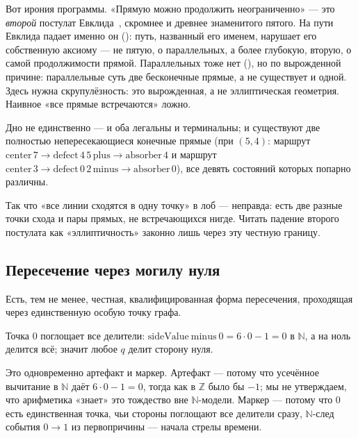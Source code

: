 Вот ирония программы. «Прямую можно продолжить неограниченно» --- это \emph{второй} постулат
Евклида~\cite{euclid-elements}, скромнее и древнее знаменитого пятого. На пути Евклида падает именно он
(): путь, названный его именем, нарушает его собственную аксиому ---
не пятую, о параллельных, а более глубокую, вторую, о самой продолжимости прямой. Параллельных тоже нет
(), но по вырожденной причине: параллельные суть две бесконечные прямые, а не
существует и одной. Здесь нужна скрупулёзность: это вырожденная, а не эллиптическая геометрия. Наивное
«все прямые встречаются» ложно.

\begin{theorem}\label{thm:two_disjoint_lines}
\green{} Дно не единственно ---  и  оба легальны и терминальны; и
существуют две полностью непересекающиеся конечные прямые (при $(5,4)$: маршрут
$\mathrm{center}\,7 \to \mathrm{defect}\,4\,5\,\mathrm{plus} \to \mathrm{absorber}\,4$ и маршрут
$\mathrm{center}\,3 \to \mathrm{defect}\,0\,2\,\mathrm{minus} \to \mathrm{absorber}\,0$), все девять
состояний которых попарно различны.
\end{theorem}

Так что «все линии сходятся в одну точку» в лоб --- неправда: есть две разные точки схода и пары
прямых, не встречающихся нигде. Читать падение второго постулата как «эллиптичность» законно лишь через
эту честную границу.

\subsection{Пересечение через могилу нуля}

Есть, тем не менее, честная, квалифицированная форма пересечения, проходящая через единственную особую
точку графа.

\begin{theorem}\label{thm:zeroPoint_absorbs_all_divisors}
\green{} Точка $0$ поглощает все делители: $\mathrm{sideValue}\ \mathrm{minus}\ 0 = 6\cdot 0 - 1 = 0$ в
$\mathbb{N}$, а на ноль делится всё; значит любое $q$ делит сторону нуля.
\end{theorem}

Это одновременно артефакт и маркер. Артефакт --- потому что усечённое вычитание в $\mathbb{N}$ даёт
$6\cdot 0 - 1 = 0$, тогда как в $\mathbb{Z}$ было бы $-1$; мы не утверждаем, что арифметика «знает»
это тождество вне $\mathbb{N}$-модели. Маркер --- потому что $0$ есть единственная точка, чьи стороны
поглощают все делители сразу, $\mathbb{N}$-след события $0 \to 1$ из первопричины --- начала стрелы
времени.

